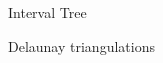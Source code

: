 		

\endgroup

\begin{frame}{Interval Tree}

    
\end{frame}

\begin{frame}{Delaunay triangulations}

\cite{DeBerg2008}
    
\end{frame}